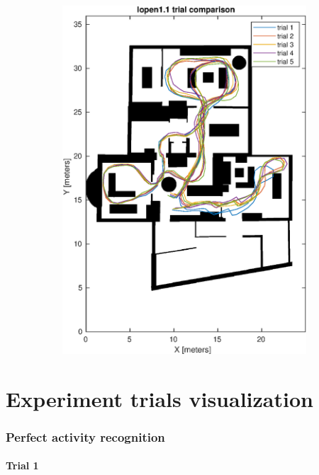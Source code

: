 \begin{figure}
	\centering
	\begin{subfigure}[t]{.45\textwidth}
		\centering
		\includegraphics[width=\linewidth]{images/20201107_1142_trial_comparison_1}
		\caption{}
		\label{fig:202011071142trialcomparison1}
	\end{subfigure}
\end{figure}

\chapter{Experiment trials visualization}
\subsection{Perfect activity recognition}
\newpage
\subsubsection{Trial 1}

